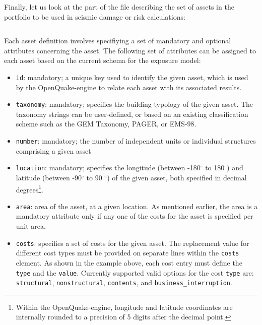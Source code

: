 Finally, let us look at the part of the file describing the set of assets in
the portfolio to be used in seismic damage or risk calculations:

\inputminted[firstline=17,firstnumber=17,lastline=27,fontsize=\footnotesize,frame=single,linenos,bgcolor=lightgray]{xml}{oqum/risk/Verbatim/input_exposure_minimal.xml}

Each asset definition involves specifiying a set of mandatory and optional
attributes concerning the asset. The following set of attributes can be
assigned to each asset based on the current schema for the exposure model:

\begin{itemize}

  \item \Verb+id+: mandatory; a unique key used to identify the given
    \gls{asset}, which is used by the OpenQuake-engine to relate each asset 
    with its associated results.

  \item \Verb+taxonomy+: mandatory; specifies the building typology of the 
    given \gls{asset}. The taxonomy strings can be user-defined, or based on
    an existing classification scheme such as the GEM Taxonomy, PAGER,
    or EMS-98.

  \item \Verb+number+: mandatory; the number of independent units or 
    individual structures comprising a given \gls{asset}

  \item \Verb+location+: mandatory; specifies the longitude 
    (between -180$^{\circ}$ to 180$^{\circ}$) and latitude 
    (between -90$^{\circ}$ to 90 $^{\circ}$) of the given \gls{asset}, both
    specified in decimal degrees\footnote{Within the OpenQuake-engine, 
    longitude and latitude coordinates are internally rounded to a precision
    of 5 digits after the decimal point.}.

  \item \Verb+area+: area of the \gls{asset}, at a given location. As 
    mentioned earlier, the area is a mandatory attribute only if any one of the 
    costs for the \gls{asset} is specified per unit area.

  \item \Verb+costs+: specifies a set of costs for the given \gls{asset}. 
    The replacement value for different cost types must be provided on 
    separate lines within the \Verb+costs+ element. As shown in the example 
    above, each cost entry must define the \Verb+type+ and the \Verb+value+. 
    Currently supported valid options for the cost \Verb+type+ are: 
    \Verb+structural+,  \Verb+nonstructural+, \Verb+contents+, and 
    \Verb+business_interruption+.


\end{itemize}
